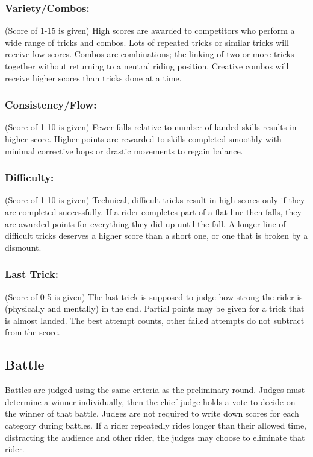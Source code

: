\subsubsection{Variety/Combos:}
(Score of 1-15 is given) High scores are awarded to competitors who perform a wide range of tricks and combos. Lots of repeated tricks or similar tricks will receive low scores. Combos are combinations; the linking of two or more tricks together without returning to a neutral riding position. Creative combos will receive higher scores than tricks done at a time.

\subsubsection{Consistency/Flow:}
(Score of 1-10 is given) Fewer falls relative to number of landed skills results in higher score. Higher points are rewarded to skills completed smoothly with minimal corrective hops or drastic movements to regain balance.

\subsubsection{Difficulty:}
(Score of 1-10 is given) Technical, difficult tricks result in high scores only if they are completed successfully. If a rider completes part of a flat line then falls, they are awarded points for everything they did up until the fall. A longer line of difficult tricks deserves a higher score than a short one, or one that is broken by a dismount.

\subsubsection{Last Trick:}
(Score of 0-5 is given) The last trick is supposed to judge how strong the rider is (physically and mentally) in the end. Partial points may be given for a trick that is almost landed. The best attempt counts, other failed attempts do not subtract from the score.

\subsection{Battle}
Battles are judged using the same criteria as the preliminary round. Judges must determine a winner individually, then the chief judge holds a vote to decide on the winner of that battle. Judges are not required to write down scores for each category during battles. If a rider repeatedly rides longer than their allowed time, distracting the audience and other rider, the judges may choose to eliminate that rider.


